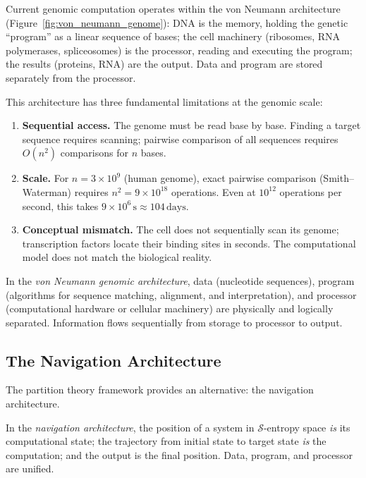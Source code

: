 Current genomic computation operates within the von Neumann architecture
(Figure~\ref{fig:von_neumann_genome}): DNA is the memory, holding the
genetic ``program'' as a linear sequence of bases; the cell machinery
(ribosomes, RNA polymerases, spliceosomes) is the processor, reading
and executing the program; the results (proteins, RNA) are the output.
Data and program are stored separately from the processor.

This architecture has three fundamental limitations at the genomic scale:

\begin{enumerate}[label=(\roman*)]
  \item \textbf{Sequential access.} The genome must be read base by base.
    Finding a target sequence requires scanning; pairwise comparison of
    all sequences requires $O(n^2)$ comparisons for $n$ bases.
  \item \textbf{Scale.} For $n = 3\times 10^9$ (human genome), exact
    pairwise comparison (Smith--Waterman) requires $n^2 = 9\times 10^{18}$
    operations. Even at $10^{12}$ operations per second, this takes
    $9\times 10^6\,\mathrm{s} \approx 104\,\mathrm{days}$.
  \item \textbf{Conceptual mismatch.} The cell does not sequentially scan
    its genome; transcription factors locate their binding sites in seconds.
    The computational model does not match the biological reality.
\end{enumerate}

\begin{definition}
\label{def:vn_architecture}
In the \emph{von Neumann genomic architecture}, data (nucleotide
sequences), program (algorithms for sequence matching, alignment,
and interpretation), and processor (computational hardware or cellular
machinery) are physically and logically separated. Information flows
sequentially from storage to processor to output.
\end{definition}

\subsection{The Navigation Architecture}
\label{ssec:navigation}

The partition theory framework provides an alternative: the navigation
architecture.

\begin{definition}
\label{def:nav_architecture}
In the \emph{navigation architecture}, the position of a system in
$\mathcal{S}$-entropy space \emph{is} its computational state; the
trajectory from initial state to target state \emph{is} the computation;
and the output is the final position. Data, program, and processor
are unified.
\end{definition}

